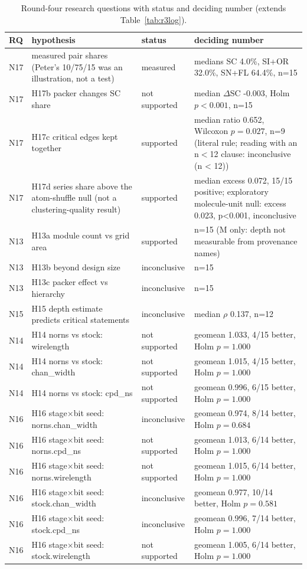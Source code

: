 \begin{table}[t]
\caption{Round-four research questions with status and deciding number (extends Table~\ref{tab:r3log}).}
\label{tab:r4log}
\centering\scriptsize
\begin{tabular}{@{}lp{4.6cm}p{3.4cm}p{8.4cm}@{}}
\toprule
RQ & hypothesis & status & deciding number \\
\midrule
N17 & measured pair shares (Peter's 10/75/15 was an illustration, not a test) & measured & medians SC 4.0\%, SI+OR 32.0\%, SN+FL 64.4\%, n=15 \\
N17 & H17b packer changes SC share & not supported & median $\Delta$SC -0.003, Holm $p<0.001$, n=15 \\
N17 & H17c critical edges kept together & supported & median ratio 0.652, Wilcoxon $p=0.027$, n=9 (literal rule; reading with an n$<$12 clause: inconclusive (n < 12)) \\
N17 & H17d series share above the atom-shuffle null (not a clustering-quality result) & supported & median excess 0.072, 15/15 positive; exploratory molecule-unit null: excess 0.023, p<0.001, inconclusive \\
N13 & H13a module count vs grid area & supported & n=15 (M only: depth not measurable from provenance names) \\
N13 & H13b beyond design size & inconclusive & n=15 \\
N13 & H13c packer effect vs hierarchy & inconclusive & n=15 \\
N15 & H15 depth estimate predicts critical statements & inconclusive & median $\rho$ 0.137, n=12 \\
N14 & H14 norns vs stock: wirelength & not supported & geomean 1.033, 4/15 better, Holm $p=1.000$ \\
N14 & H14 norns vs stock: chan\_width & not supported & geomean 1.015, 4/15 better, Holm $p=1.000$ \\
N14 & H14 norns vs stock: cpd\_ns & not supported & geomean 0.996, 6/15 better, Holm $p=1.000$ \\
N16 & H16 stage$\times$bit seed: norns.chan\_width & inconclusive & geomean 0.974, 8/14 better, Holm $p=0.684$ \\
N16 & H16 stage$\times$bit seed: norns.cpd\_ns & not supported & geomean 1.013, 6/14 better, Holm $p=1.000$ \\
N16 & H16 stage$\times$bit seed: norns.wirelength & not supported & geomean 1.015, 6/14 better, Holm $p=1.000$ \\
N16 & H16 stage$\times$bit seed: stock.chan\_width & inconclusive & geomean 0.977, 10/14 better, Holm $p=0.581$ \\
N16 & H16 stage$\times$bit seed: stock.cpd\_ns & inconclusive & geomean 0.996, 7/14 better, Holm $p=1.000$ \\
N16 & H16 stage$\times$bit seed: stock.wirelength & not supported & geomean 1.005, 6/14 better, Holm $p=1.000$ \\
\bottomrule
\end{tabular}
\end{table}
